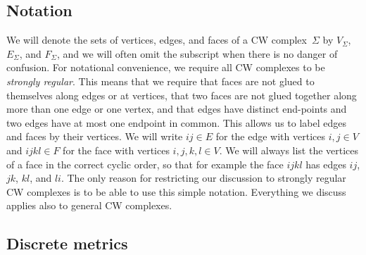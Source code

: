 \documentclass[Thesis]{subfiles}
\begin{document}
\subsection{Notation}
\label{sec:notation}

We will denote the sets of vertices, edges, and faces of a CW complex~$\Sigma$ by $V_{\Sigma}$, $E_{\Sigma}$, and $F_{\Sigma}$, and we will often omit the subscript when there is no danger of confusion.
For notational convenience, we require all CW complexes to be \emph{strongly regular}. 
This means that we require that faces are not glued to themselves along edges or at vertices, that two faces are not glued together along more than one edge or one vertex, and that edges have distinct end-points and two edges have at most one endpoint in common. 
This allows us to label edges and faces by their vertices. 
We will write $\mathit{ij}\in E$ for the edge with vertices $i,j\in V$ and $\mathit{ijkl}\in F$ for the face with vertices $i,j,k,l\in V$. 
We will always list the vertices of a face in the correct cyclic order, so that for example the face $\mathit{ijkl}$ has edges $\mathit{ij}$, $\mathit{jk}$, $\mathit{kl}$, and $\mathit{li}$.
The only reason for restricting our discussion to strongly regular CW complexes is to be able to use this simple notation. 
Everything we discuss applies also to general CW complexes.


\subsection{Discrete metrics}
\label{sec:discrete_metrics}
\end{document}
